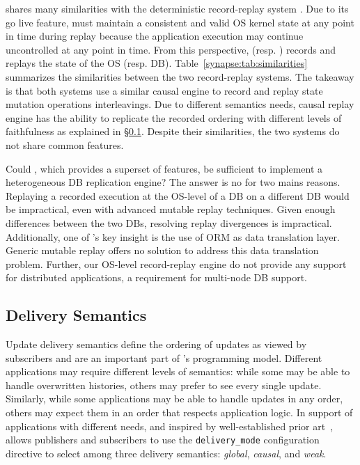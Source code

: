 \synapse shares many similarities with the deterministic record-replay system \scribe.
Due to its go live feature, \scribe must maintain a consistent and valid OS
kernel state at any point in time during replay because the application
execution may continue uncontrolled at any point in time.
From this perspective, \scribe (resp. \synapse) records and replays the state of
the OS (resp. DB).
Table~\ref{synapse:tab:similarities} summarizes the similarities between the
two record-replay systems. The takeaway is that both systems use a
similar causal engine to record and replay state mutation operations interleavings.
Due to different semantics needs, \synapse causal replay engine has the ability
to replicate the recorded ordering with different levels of faithfulness
as explained in \S\ref{synapse:sec:semantics}.
Despite their similarities, the two systems do not share common features.

Could \dora, which provides a superset of \scribe features,
be sufficient to implement a heterogeneous DB replication
engine? The answer is no for two mains reasons. Replaying a recorded execution at
the OS-level of a DB on a different DB would be impractical, even with advanced
mutable replay techniques. Given enough differences between the two DBs,
resolving replay divergences is impractical. Additionally, one of
\synapse's key insight is the use of ORM as data translation layer. Generic mutable
replay offers no solution to address this data translation problem.
Further, our OS-level record-replay engine do not provide any
support for distributed applications, a requirement for multi-node DB support.

\subsection{\synapse Delivery Semantics}
\label{synapse:sec:semantics}
Update delivery semantics define the ordering of updates as viewed by subscribers and are an important part of \synapse's
programming model. Different applications may 
require different levels of semantics:  while some may be able to handle overwritten histories,
others may prefer to see every single update.  Similarly, while some
applications may be able to  handle updates in any order, others may expect them in an
order that respects application logic. In support of applications with
different needs, and inspired by well-established prior
art~\cite{Birman:1991:LCA:128738.128742}, \synapse allows
publishers and subscribers to use the {\tt delivery\_mode} configuration directive
to select among three delivery semantics: {\em global}, {\em causal},
and {\em weak}. 

